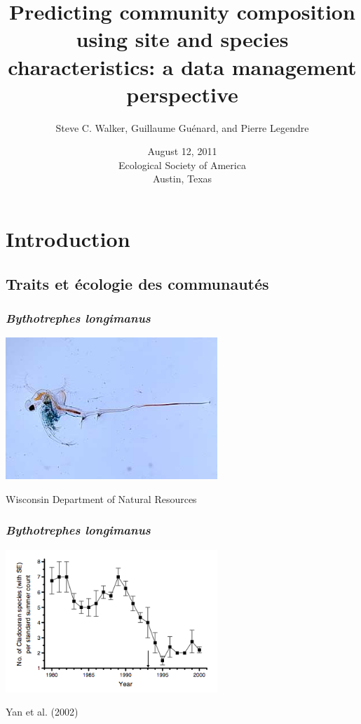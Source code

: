 \documentclass{beamer}
\title[Data management]{Predicting community composition using site and species characteristics:  a data management perspective}
\author[Steve C. Walker \\ Guillaume Gu\'{e}nard \\ Pierre Legendre]{Steve C. Walker, Guillaume Gu\'{e}nard, and Pierre Legendre}
\institute[Montr\'{e}al]{\insertlogo \\ D\'{e}partement de Sciences Biologiques}
\date[August 12, 2011]{August 12, 2011 \\ Ecological Society of America \\ Austin, Texas}
\numberwithin{exercise}{section}
\begin{document}
\maketitle

\section{Introduction}

\subsection[Traits et \'{e}cologie]{Traits et \'{e}cologie des communaut\'{e}s}

\begin{frame}
\frametitle{\textit{Bythotrephes longimanus}}
\begin{center}
\includegraphics[width=8cm]{waterflea}
\end{center}
\vspace{0.5cm}
\footnotesize{Wisconsin Department of Natural Resources}
\end{frame}

\begin{frame}
\frametitle{\textit{Bythotrephes longimanus}}
\begin{center}
\includegraphics[width=8cm]{Yan}
\end{center}
\vspace{0.5cm}
\footnotesize{Yan et al. (2002)}
\end{frame}
\end{document}
